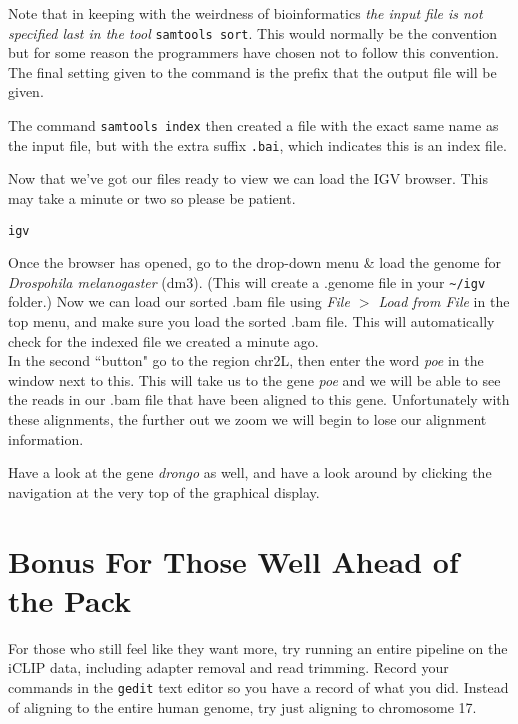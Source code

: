 \begin{information}
Note that in keeping with the weirdness of bioinformatics \textit{the input file is not specified last in the tool} \texttt{samtools sort}.
This would normally be the convention but for some reason the programmers have chosen not to follow this convention.
The final setting given to the command is the prefix that the output file will be given. \\
\end{information}

The command \texttt{samtools index} then created a file with the exact same name as the input file, but with the extra suffix \texttt{.bai}, which indicates this is an index file.\\

\begin{steps}
Now that we've got our files ready to view we can load the IGV browser.
This may take a minute or two so please be patient.

\begin{lstlisting}
igv
\end{lstlisting}
\end{steps}

\begin{steps}
Once the browser has opened, go to the drop-down menu \& load the genome for \textit{Drospohila melanogaster} (dm3).
(This will create a .genome file in your \texttt{\~{}/igv} folder.)
Now we can load our sorted .bam file using  \textit{File $>$ Load from File} in the top menu, and make sure you load the sorted .bam file.
This will automatically check for the indexed file we created a minute ago. \\

In the second ``button" go to the region chr2L, then enter the word \textit{poe} in the window next to this.
This will take us to the gene \textit{poe} and we will be able to see the reads in our .bam file that have been aligned to this gene.
Unfortunately with these alignments, the further out we zoom we will begin to lose our alignment information.

Have a look at the gene \textit{drongo} as well, and have a look around by clicking the navigation at the very top of the graphical display.
\end{steps}

\section{Bonus For Those Well Ahead of the Pack}
\begin{advanced}
For those who still feel like they want more, try running an entire pipeline on the iCLIP data, including adapter removal and read trimming.
Record your commands in the \texttt{gedit} text editor so you have a record of what you did.
Instead of aligning to the entire human genome, try just aligning to chromosome 17.
\end{advanced}


